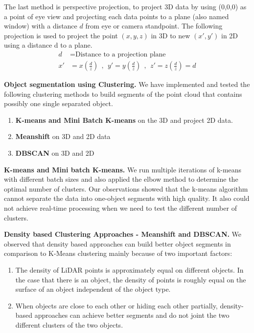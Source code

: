The last method is perspective projection,
to project 3D data by using 
(0,0,0) as
a point of eye view and projecting each data points
to a plane (also named window) with a distance $d$ from eye or camera standpoint.
The following projection is used to project the point $(x,y,z)$ in 3D to new $(x',  y')$ in 2D
using a distance d to a plane.
\begin{align*}
d  & = \text{Distance to a projection plane} \\
x' & =  x (\frac{d}{z}) \ \  , \ \  y' =  y (\frac{d}{z}) \ \  , \ \  z'=  z (\frac{d}{z}) = d
\end{align*}

\textbf{Object segmentation using Clustering.}
We have implemented and tested the following clustering methods to 
build segments of the point cloud
that contains 
possibly one single separated object.

\begin{enumerate}
  \item \textbf{K-means and Mini Batch K-means} on the 3D and project 2D data.
  \item \textbf{Meanshift} on 3D and 2D data
  \item \textbf{DBSCAN} on 3D and 2D
\end{enumerate}

\textbf{K-means and Mini batch K-means.}
We run multiple iterations of k-means with
different batch sizes and also applied the elbow method to determine the optimal number of clusters.
Our observations %
showed that the k-means algorithm cannot separate the data into one-object segments with high quality.
It also could not achieve real-time processing when we need to test the different number of clusters.

\textbf{Density based Clustering Approaches - Meanshift and DBSCAN.}
We observed that density based approaches can build better object segments in comparison to K-Means clustering mainly because of two important factors:
\begin{enumerate}
	\item The density of LiDAR points is approximately equal on different objects.
	In the case that there is an object, the density of points is roughly equal on the surface of an object independent of the object type.
	
	\item When objects are close to each other or hiding each
	other partially, density-based approaches can achieve better segments and do not joint the two different clusters of the two objects.	
	
\end{enumerate}
 


